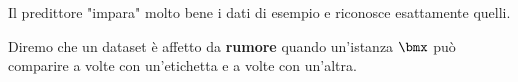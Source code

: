 \documentclass[\main/main.tex]{subfiles}
\begin{document}
\begin{multicols}{2}
\begin{definition}[Overfitting]
    Il predittore "impara" molto bene i dati di esempio e riconosce esattamente quelli.
\end{definition}
\begin{definition}[Rumore]
    Diremo che un dataset è affetto da \textbf{rumore} quando un'istanza \(\bmx\) può comparire a volte con un'etichetta e a volte con un'altra.
\end{definition}
\end{multicols}
\end{document}
